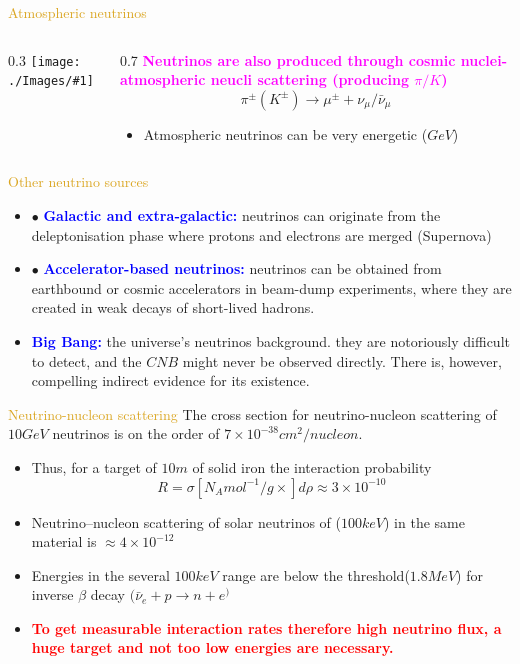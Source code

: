 \documentclass[11pt]{beamer} %
\renewcommand{\(}{\begin{columns}}
\renewcommand{\)}{\end{columns}}
\newcommand{\<}[1]{\begin{column}{#1}}
\renewcommand{\>}{\end{column}}
\newcommand{\itt}{\begin{itemize}}
\newcommand{\tti}{\end{itemize}}
\newcommand{\img}[1]{\texttt{[image: ./Images/\#1]}}
\newcommand{\hlt}[2]{\textcolor{#1}{\textbf{#2}}}
\begin{document}
\begin{frame}{\textcolor{Goldenrod}{Atmospheric neutrinos}}
  \(
  \<{0.3\linewidth}
   \img{atmospheric_neutrinos}
  \>
  \<{0.7\linewidth}
  \hlt{Magenta}{Neutrinos are also produced
    through cosmic nuclei-atmospheric neucli scattering (producing $\pi/
    K$)}
  \[
    \pi^{\pm}(K^{\pm}) \to \mu^{\pm} + \nu_{\mu}/\bar{\nu}_{\mu}
  \]
  \itt
\item<2-> \alert{Atmospheric neutrinos can be very energetic ($GeV$)}
  \tti
  \>
  \)
\end{frame}  

\begin{frame}{\textcolor{Goldenrod}{Other neutrino sources}}
  \itt
\item[$\bullet$] \hlt{blue}{Galactic and extra‐galactic:} neutrinos
  can originate from the deleptonisation phase where protons and
  electrons are merged (Supernova)
\item[$\bullet$] \hlt{blue}{Accelerator-based neutrinos:} neutrinos can be
  obtained from earthbound or cosmic accelerators in beam-dump
  experiments, where they are created in weak decays of short-lived
  hadrons.
\item \hlt{blue}{Big Bang:} the universe's neutrinos background.
  \alert{they are notoriously difficult to detect, and the $CNB$
    might never be observed directly. There is, however, compelling
    indirect evidence for its existence.}
  \tti
\end{frame}

\begin{frame}{\textcolor{Goldenrod}{Neutrino-nucleon scattering}}
  The cross section for neutrino-nucleon scattering of $10 GeV$
  neutrinos is on the order of $7 \times 10^{-38} cm^2/nucleon$.
  \itt[<+->]
\item Thus, for a target of $10 m$ of solid iron the interaction
  probability
  \[
    R = \sigma [N_A mol^{-1}/g \times] d\rho \approx 3\times 10^{-10}
  \]
\item \textcolor{RoyalPurple}{Neutrino–nucleon scattering of solar neutrinos of ($100 keV$) in
  the same material is $\approx 4\times 10^{-12}$}
\item Energies in the several $100keV$ range are below the
  threshold($1.8 MeV$) for inverse $\beta$ decay $(\bar{\nu}_{e} + p \to n + e^)$
\item \hlt{Red}{To get measurable interaction rates therefore high
    neutrino flux, a huge target and not too low energies are necessary.}
  \tti
\end{frame} 
\end{document}
